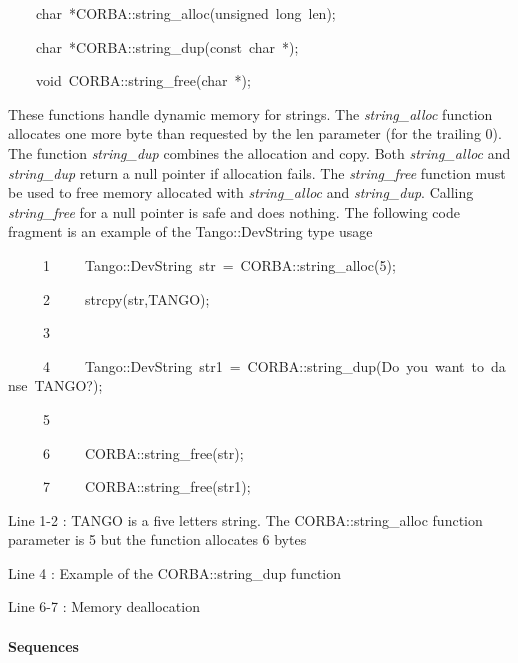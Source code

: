 
\begin{lyxcode}
~~~~char~{*}CORBA::string\_alloc(unsigned~long~len);

~~~~char~{*}CORBA::string\_dup(const~char~{*});

~~~~void~CORBA::string\_free(char~{*});
\end{lyxcode}


These functions handle dynamic memory for strings. The \emph{string\_alloc}
function allocates one more byte than requested by the len parameter
(for the trailing 0). The function \emph{string\_dup}
combines the allocation and copy. Both \emph{string\_alloc} and \emph{string\_dup}
return a null pointer if allocation fails. The \emph{string\_free}
function must be used to free memory allocated with \emph{string\_alloc}
and \emph{string\_dup}. Calling \emph{string\_free} for a null pointer
is safe and does nothing. The following code fragment is an example
of the Tango::DevString type usage


\begin{lyxcode}
~~~~~1~~~~~Tango::DevString~str~=~CORBA::string\_alloc(5);

~~~~~2~~~~~strcpy(str,\textquotedbl{}TANGO\textquotedbl{});

~~~~~3~~

~~~~~4~~~~~Tango::DevString~str1~=~CORBA::string\_dup(\textquotedbl{}Do~you~want~to~danse~TANGO?\textquotedbl{});

~~~~~5~~

~~~~~6~~~~~CORBA::string\_free(str);

~~~~~7~~~~~CORBA::string\_free(str1);
\end{lyxcode}


Line 1-2 : TANGO is a five letters string. The CORBA::string\_alloc
function parameter is 5 but the function allocates 6 bytes

Line 4 : Example of the CORBA::string\_dup function

Line 6-7 : Memory deallocation

\paragraph{Sequences}

